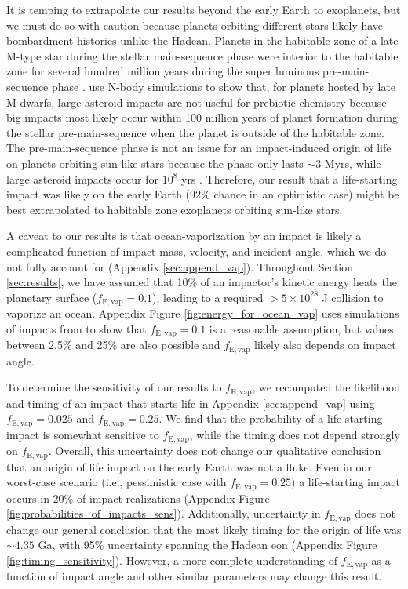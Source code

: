 \documentclass{aastex631}
\begin{document}
It is temping to extrapolate our results beyond the early Earth to exoplanets, but we must do so with caution because planets orbiting different stars likely have bombardment histories unlike the Hadean. Planets in the habitable zone of a late M-type star during the stellar main-sequence phase were interior to the habitable zone for several hundred million years during the super luminous pre-main-sequence phase \citep{Luger_2015}. \citet{Lichtenberg_2022} use N-body simulations to show that, for planets hosted by late M-dwarfs, large asteroid impacts are not useful for prebiotic chemistry because big impacts most likely occur within 100 million years of planet formation during the stellar pre-main-sequence when the planet is outside of the habitable zone. The pre-main-sequence phase is not an issue for an impact-induced origin of life on planets orbiting sun-like stars because the phase only lasts $\sim 3$ Myrs, while large asteroid impacts occur for $10^8$ yrs \citep{Lichtenberg_2022}. Therefore, our result that a life-starting impact was likely on the early Earth (92\% chance in an optimistic case) might be best extrapolated to habitable zone exoplanets orbiting sun-like stars.

A caveat to our results is that ocean-vaporization by an impact is likely a complicated function of impact mass, velocity, and incident angle, which we do not fully account for (Appendix \ref{sec:append_vap}). Throughout Section \ref{sec:results}, we have assumed that 10\% of an impactor's kinetic energy heats the planetary surface ($f_\mathrm{E,vap} = 0.1$), leading to a required $> 5 \times 10^{28}$ J collision to vaporize an ocean. Appendix Figure \ref{fig:energy_for_ocean_vap} uses simulations of impacts from \citet{Citron_2022} to show that $f_\mathrm{E,vap} = 0.1$ is a reasonable assumption, but values between 2.5\% and 25\% are also possible and $f_\mathrm{E,vap}$ likely also depends on impact angle.

To determine the sensitivity of our results to $f_\mathrm{E,vap}$, we recomputed the likelihood and timing of an impact that starts life in Appendix \ref{sec:append_vap} using $f_\mathrm{E,vap} = 0.025$ and $f_\mathrm{E,vap} = 0.25$. We find that the probability of a life-starting impact is somewhat sensitive to $f_\mathrm{E,vap}$, while the timing does not depend strongly on $f_\mathrm{E,vap}$. Overall, this uncertainty does not change our qualitative conclusion that an origin of life impact on the early Earth was not a fluke. Even in our worst-case scenario (i.e., \citet{Wogan_2023} pessimistic case with $f_\mathrm{E,vap} = 0.25$) a life-starting impact occurs in 20\% of impact realizations (Appendix Figure \ref{fig:probabilities_of_impacts_sens}). Additionally, uncertainty in $f_\mathrm{E,vap}$ does not change our general conclusion that the most likely timing for the origin of life was $\sim 4.35$ Ga, with 95\% uncertainty spanning the Hadean eon (Appendix Figure \ref{fig:timing_sensitivity}). However, a more complete understanding of $f_\mathrm{E,vap}$ as a function of impact angle and other similar parameters may change this result.
\end{document}
